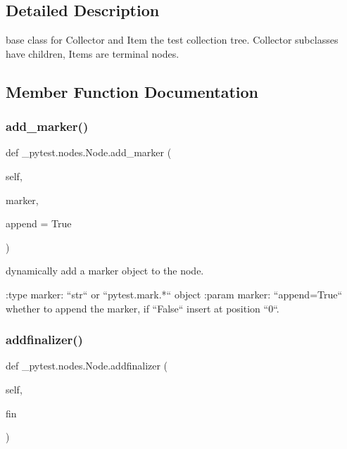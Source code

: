 \subsection{Detailed Description}
\begin{DoxyVerb}base class for Collector and Item the test collection tree.
Collector subclasses have children, Items are terminal nodes.\end{DoxyVerb}
 

\subsection{Member Function Documentation}
\mbox{\label{class__pytest_1_1nodes_1_1_node_a1d28d2a0ab91d7845025435ff7d3ff7c}} 
\subsubsection{\texorpdfstring{add\+\_\+marker()}{add\_marker()}}
{\footnotesize\ttfamily def \+\_\+pytest.\+nodes.\+Node.\+add\+\_\+marker (\begin{DoxyParamCaption}\item[{}]{self,  }\item[{}]{marker,  }\item[{}]{append = {\ttfamily True} }\end{DoxyParamCaption})}

\begin{DoxyVerb}dynamically add a marker object to the node.

:type marker: ``str`` or ``pytest.mark.*``  object
:param marker:
    ``append=True`` whether to append the marker,
    if ``False`` insert at position ``0``.
\end{DoxyVerb}
 \mbox{\label{class__pytest_1_1nodes_1_1_node_a7cd4d492cfe9587ec3e2115a3aba47f5}} 
\subsubsection{\texorpdfstring{addfinalizer()}{addfinalizer()}}
{\footnotesize\ttfamily def \+\_\+pytest.\+nodes.\+Node.\+addfinalizer (\begin{DoxyParamCaption}\item[{}]{self,  }\item[{}]{fin }\end{DoxyParamCaption})}

